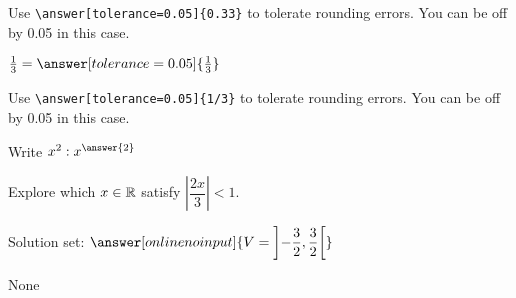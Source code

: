 \documentclass{ximera}
\begin{document}
\begin{exercise}
\begin{question}
            Use \verb|\answer[tolerance=0.05]{0.33}| to tolerate rounding errors. You can be off by 0.05 in this case.
        \end{question}

        \begin{question}
            $\frac{1}{3} =  \answer[tolerance=0.05]{\frac{1}{3}}$  

            Use \verb|\answer[tolerance=0.05]{1/3}| to tolerate rounding errors. You can be off by 0.05 in this case.
        \end{question}




        \begin{question} Write $x^2: x^{\answer{2}}$
        \end{question}


    \end{exercise}

    \begin{example} Explore which $x\in \mathbb{R}$ satisfy $\left|\dfrac{2x}{3}\right|<1$.

        \begin{basicSkip}
        Solution set: $\answer[onlinenoinput]{\displaystyle
            V=\left]-\frac{3}{2},\frac{3}{2}\right[}$
        \end{basicSkip}
        \begin{oplossing}
            None
        \end{oplossing}
    \end{example}
\end{document}
